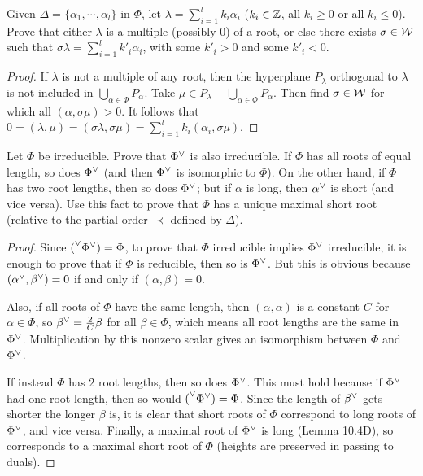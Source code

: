\begin{ex}
  Given $\Delta = \{\alpha_1,\cdots,\alpha_l\}$ in $\Phi$, let $\lambda = \sum\limits_{i=1}^l k_i\alpha_i$ ($k_i \in{\mathbb Z}$, all $k_i \geqslant 0$ or all $k_i \leqslant 0$). Prove that either $\lambda$ is a multiple (possibly $0$) of a root, or else there exists $\sigma\in{\cal W}$ such that $\sigma\lambda = \sum\limits_{i=1}^l k'_i\alpha_i$, with some $k'_i > 0$ and some $k'_i < 0$.
\end{ex}
\begin{proof}
  If $\lambda$ is not a multiple of any root, then the hyperplane $P_{\lambda}$ orthogonal to $\lambda$ is not included in $\bigcup\limits_{\alpha\in\Phi} P_{\alpha}$. Take $\mu\in P_{\lambda} - \bigcup\limits_{\alpha\in\Phi} P_{\alpha}$. Then find $\sigma\in{\cal W}$ for which all $(\alpha,\sigma\mu) > 0$. It follows that $0 = (\lambda,\mu) = (\sigma\lambda,\sigma\mu) = \sum\limits_{i=1}^l k_i(\alpha_i,\sigma\mu)$.
\end{proof}

\begin{ex}\label{10.11}
  Let $\Phi$ be irreducible. Prove that ${\Phi}^{\vee}$ is also irreducible. If $\Phi$ has all roots of equal length, so does ${\Phi}^{\vee}$ (and then ${\Phi}^{\vee}$ is isomorphic to $\Phi$). On the other hand, if $\Phi$ has two root lengths, then so does ${\Phi}^{\vee}$; but if $\alpha$ is long, then ${\alpha}^{\vee}$ is short (and vice versa). Use this fact to prove that $\Phi$ has a unique maximal short root (relative to the partial order $\prec$ defined by $\Delta$).
\end{ex}
\begin{proof}
  Since ${(}^{\vee}{\Phi}^{\vee}) = \Phi$, to prove that $\Phi$ irreducible implies ${\Phi}^{\vee}$ irreducible, it is enough to prove that if $\Phi$ is reducible, then so is ${\Phi}^{\vee}$. But this is obvious because $({\alpha}^{\vee}, {\beta}^{\vee}) = 0$ if and only if $(\alpha,\beta) = 0$.

  Also, if all roots of $\Phi$ have the same length, then $(\alpha,\alpha)$ is a constant $C$ for $\alpha\in\Phi$, so ${\beta}^{\vee} = \frac{2}{C} \beta$ for all $\beta \in\Phi$, which means all root lengths are the same in ${\Phi}^{\vee}$. Multiplication by this nonzero scalar gives an isomorphism between $\Phi$ and ${\Phi}^{\vee}$.

  If instead $\Phi$ has $2$ root lengths, then so does ${\Phi}^{\vee}$. This must hold because if ${\Phi}^{\vee}$ had one root length, then so would ${(}^{\vee}{\Phi}^{\vee}) = \Phi$. Since the length of ${\beta}^{\vee}$ gets shorter the longer $\beta$ is, it is clear that short roots of $\Phi$ correspond to long roots of ${\Phi}^{\vee}$, and vice versa. Finally, a maximal root of ${\Phi}^{\vee}$ is long (Lemma 10.4D), so corresponds to a maximal short root of $\Phi$ (heights are preserved in passing to duals).
\end{proof}

